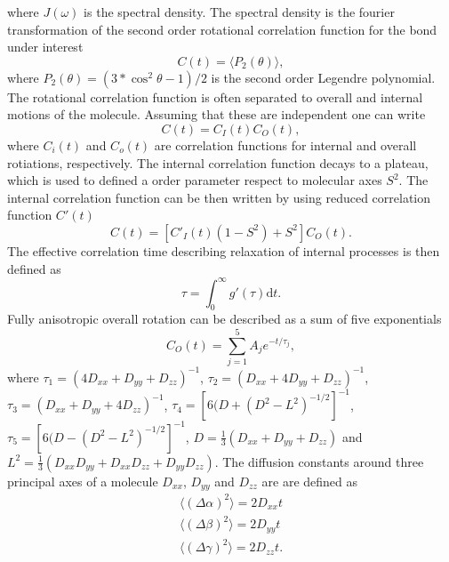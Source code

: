 \documentclass[pre,aps,floatfix,authordate1-4,twocolumn]{revtex4-1}
\begin{document}
where $J(\omega)$ is the spectral density. The spectral density is the
fourier transformation of the second order rotational correlation function
for the bond under interest
\begin{equation}
  C(t)=\langle P_2(\theta) \rangle,
\end{equation}
where $P_2(\theta)=(3*\cos^2\theta-1)/2$ is the second order Legendre polynomial.
The rotational correlation function is often separated to overall and internal
motions of the molecule. Assuming that these are independent one can write
\begin{equation}
  C(t)=C_I(t)C_O(t),
\end{equation}
where $C_i(t)$ and $C_o(t)$ are correlation functions for internal and overall
rotiations, respectively. The internal correlation function decays to a plateau, which
is used to defined a order parameter respect to molecular axes $S^2$.
The internal correlation function can be then written by using
reduced correlation function $C'(t)$
\begin{equation}
  C(t)=[C'_I(t)(1-S^2)+S^2]C_O(t).
\end{equation}
The effective correlation time describing relaxation of internal
processes is then defined as
\begin{equation}
  \tau=\int_0^\infty g'(\tau) \mathrm{d}t.
\end{equation}
Fully anisotropic overall rotation can be described as a sum of five exponentials
\begin{equation}
  C_O(t)=\sum_{j=1}^5 A_j e^{-t/\tau_j},
\end{equation}
where
$\tau_1=(4D_{xx}+D_{yy}+D_{zz})^{-1}$,
$\tau_2=(D_{xx}+4D_{yy}+D_{zz})^{-1}$,
$\tau_3=(D_{xx}+D_{yy}+4D_{zz})^{-1}$,
$\tau_4=[6(D+(D^2-L^2)^{-1/2}]^{-1}$,
$\tau_5=[6(D-(D^2-L^2)^{-1/2}]^{-1}$,
$D=\frac{1}{3}(D_{xx}+D_{yy}+D_{zz})$ and 
$L^2=\frac{1}{3}(D_{xx}D_{yy}+D_{xx}D_{zz}+D_{yy}D_{zz})$.
The diffusion constants around
three principal axes of a molecule
$D_{xx}$, $D_{yy}$ and $D_{zz}$ are 
are defined as 
\begin{equation}
\begin{aligned}
  \langle (\Delta \alpha)^2 \rangle = 2 D_{xx} t \\
  \langle (\Delta \beta)^2 \rangle = 2 D_{yy} t \\
  \langle (\Delta \gamma)^2 \rangle = 2 D_{zz} t. \\
\end{aligned}
\end{equation}
\end{document}
